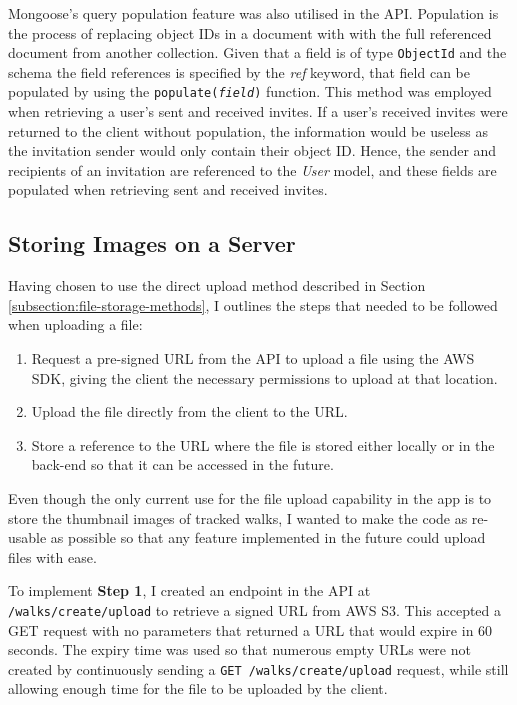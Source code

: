 Mongoose's query population feature was also utilised in the API. Population is the process of replacing object IDs in a document with with the full referenced document from another collection. Given that a field is of type \verb|ObjectId| and the schema the field references is specified by the \textit{ref} keyword, that field can be populated by using the \texttt{populate(\textit{field})} function. This method was employed when retrieving a user's sent and received invites. If a user's received invites were returned to the client without population, the information would be useless as the invitation sender would only contain their object ID. Hence, the sender and recipients of an invitation are referenced to the \textit{User} model, and these fields are populated when retrieving sent and received invites.


\subsection{Storing Images on a Server} \label{implementation:storing-images}

Having chosen to use the direct upload method described in Section \ref{subsection:file-storage-methods}, I outlines the steps that needed to be followed when uploading a file:

\begin{enumerate}[label=\textbf{Step \arabic*}]
  \item Request a pre-signed URL from the API to upload a file using the AWS SDK, giving the client the necessary permissions to upload at that location.
  \item Upload the file directly from the client to the URL.
  \item Store a reference to the URL where the file is stored either locally or in the back-end so that it can be accessed in the future.
\end{enumerate}

Even though the only current use for the file upload capability in the app is to store the thumbnail images of tracked walks, I wanted to make the code as re-usable as possible so that any feature implemented in the future could upload files with ease.

To implement \textbf{Step 1}, I created an endpoint in the API at \texttt{/walks/create/upload} to retrieve a signed URL from AWS S3. This accepted a GET request with no parameters that returned a URL that would expire in 60 seconds. The expiry time was used so that numerous empty URLs were not created by continuously sending a \texttt{GET /walks/create/upload} request, while still allowing enough time for the file to be uploaded by the client.

